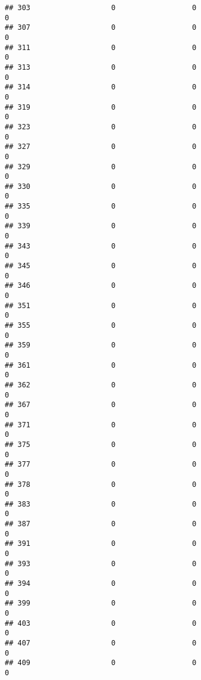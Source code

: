 \documentclass[
]{article}
\begin{document}
\begin{verbatim}
## 303                   0                  0                              0
## 307                   0                  0                              0
## 311                   0                  0                              0
## 313                   0                  0                              0
## 314                   0                  0                              0
## 319                   0                  0                              0
## 323                   0                  0                              0
## 327                   0                  0                              0
## 329                   0                  0                              0
## 330                   0                  0                              0
## 335                   0                  0                              0
## 339                   0                  0                              0
## 343                   0                  0                              0
## 345                   0                  0                              0
## 346                   0                  0                              0
## 351                   0                  0                              0
## 355                   0                  0                              0
## 359                   0                  0                              0
## 361                   0                  0                              0
## 362                   0                  0                              0
## 367                   0                  0                              0
## 371                   0                  0                              0
## 375                   0                  0                              0
## 377                   0                  0                              0
## 378                   0                  0                              0
## 383                   0                  0                              0
## 387                   0                  0                              0
## 391                   0                  0                              0
## 393                   0                  0                              0
## 394                   0                  0                              0
## 399                   0                  0                              0
## 403                   0                  0                              0
## 407                   0                  0                              0
## 409                   0                  0                              0

\end{verbatim}
\end{document}
